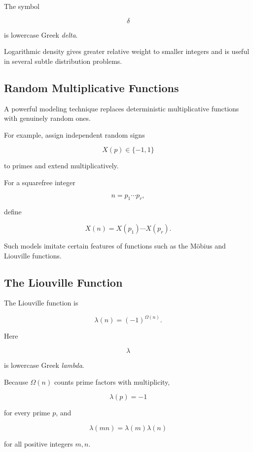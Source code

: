 The symbol

\[ \delta \]

is lowercase Greek \emph{delta}.

Logarithmic density gives greater relative weight to smaller integers and is
useful in several subtle distribution problems.

\subsection{Random Multiplicative Functions}
\label{subsec:random-multiplicative-functions}

A powerful modeling technique replaces deterministic multiplicative
functions with genuinely random ones.

For example, assign independent random signs

\[ X(p)\in\{-1,1\} \]

to primes and extend multiplicatively.

For a squarefree integer

\[ n=p_1\cdots p_r, \]

define

\[ X(n)=X(p_1)\cdots X(p_r). \]

Such models imitate certain features of functions such as the Möbius and
Liouville functions.

\subsection{The Liouville Function}
\label{subsec:liouville-probabilistic}

The Liouville function is

\[ \lambda(n)=(-1)^{\Omega(n)}. \]

Here

\[ \lambda \]

is lowercase Greek \emph{lambda}.

Because \(\Omega(n)\) counts prime factors with multiplicity,

\[ \lambda(p)=-1 \]

for every prime \(p\), and

\[ \lambda(mn)=\lambda(m)\lambda(n) \]

for all positive integers \(m,n\).


